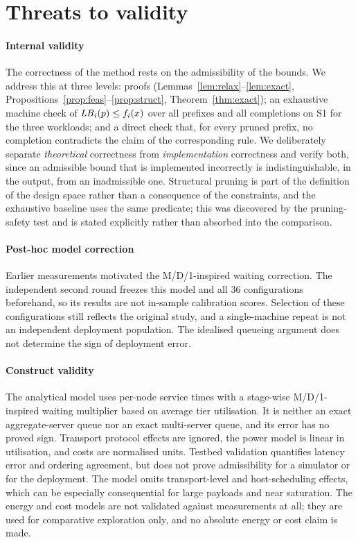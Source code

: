 \section{Threats to validity}
\label{sec:threats}

\paragraph{Internal validity}
The correctness of the method rests on the admissibility of the bounds. We address this
at three levels: proofs (Lemmas~\ref{lem:relax}--\ref{lem:exact},
Propositions~\ref{prop:feas}--\ref{prop:struct}, Theorem~\ref{thm:exact}); an exhaustive
machine check of $\mathit{LB}_i(p)\le f_i(x)$ over all prefixes and all completions on S1 for the
three workloads; and a direct check that, for every pruned prefix, no completion
contradicts the claim of the corresponding rule. We deliberately separate \emph{theoretical}
correctness from \emph{implementation} correctness and verify both, since an admissible
bound that is implemented incorrectly is indistinguishable, in the output, from an
inadmissible one. Structural pruning is part of the definition of the design space rather
than a consequence of the constraints, and the exhaustive baseline uses the same
predicate; this was discovered by the pruning-safety test and is stated explicitly rather
than absorbed into the comparison.

\paragraph{Post-hoc model correction}
Earlier measurements motivated the M/D/1-inspired waiting correction. The independent
second round freezes this model and all 36 configurations beforehand, so its results are
not in-sample calibration scores. Selection of these configurations still reflects the
original study, and a single-machine repeat is not an independent deployment population.
The idealised queueing argument does not determine the sign of deployment error.

\paragraph{Construct validity}
The analytical model uses per-node service times with a stage-wise M/D/1-inspired
waiting multiplier based on average tier utilisation. It is neither an exact
aggregate-server queue nor an exact multi-server queue, and its error has no
proved sign. Transport protocol effects are ignored, the power model is linear
in utilisation, and costs are normalised units. Testbed validation quantifies
latency error and ordering agreement, but does not prove admissibility for a
simulator or for the deployment.
The model omits transport-level and host-scheduling effects, which can be especially consequential for large payloads and near saturation.
The energy and cost models are not validated against measurements at all; they are used
for comparative exploration only, and no absolute energy or cost claim is made.

